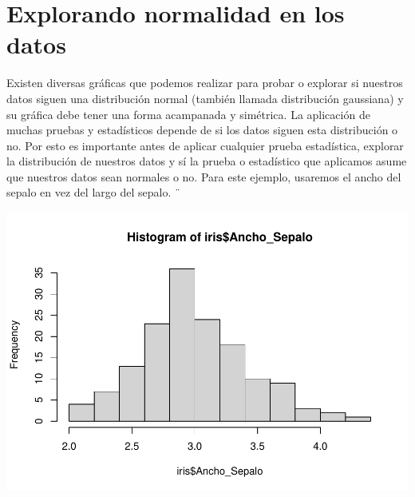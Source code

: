 \documentclass[
]{book}
\newenvironment{Shaded}{\begin{snugshade}}{\end{snugshade}}
\newcommand{\FunctionTok}[1]{\textcolor[rgb]{0.13,0.29,0.53}{\textbf{#1}}}
\newcommand{\NormalTok}[1]{#1}
\newcommand{\SpecialCharTok}[1]{\textcolor[rgb]{0.81,0.36,0.00}{\textbf{#1}}}
\begin{document}
\hfill\break

\section{Explorando normalidad en los datos}\label{explorando-normalidad-en-los-datos}

Existen diversas gráficas que podemos realizar para probar o explorar si nuestros datos siguen una distribución normal (también llamada distribución gaussiana) y su gráfica debe tener una forma acampanada y simétrica.
La aplicación de muchas pruebas y estadísticos depende de si los datos siguen esta distribución o no.
Por esto es importante antes de aplicar cualquier prueba estadística, explorar la distribución de nuestros datos y sí la prueba o estadístico que aplicamos asume que nuestros datos sean normales o no.
Para este ejemplo, usaremos el ancho del sepalo en vez del largo del sepalo.
¨

\hfill\break

\begin{Shaded}
\end{Shaded}

\includegraphics{_main_files/figure-latex/unnamed-chunk-247-1.pdf}

\begin{Shaded}
\end{Shaded}
\end{document}
